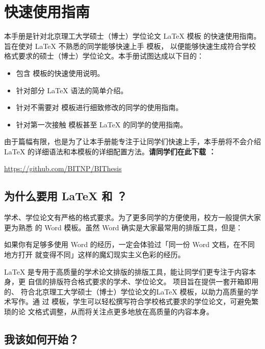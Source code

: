 \chapter{快速使用指南}
\label{chap:what}

本手册是针对北京理工大学硕士（博士）学位论文 \LaTeX{} 模板 \BIThesis{} 的快速使用指南。
旨在使对 \LaTeX{} 不熟悉的同学能够快速上手 \BIThesis{} 模板，
以便能够快速生成符合学校格式要求的硕士（博士）学位论文。本手册试图达成以下目的：
\begin{itemize}[noitemsep]
  \item 包含 \BIThesis{} 模板的快速使用说明。
  \item 针对部分 \LaTeX{} 语法的简单介绍。
  \item 针对不需要对 \BIThesis{} 模板进行细致修改的同学的使用指南。
  \item 针对第一次接触 \BIThesis{} 模板甚至 \LaTeX{} 的同学的使用指南。
\end{itemize}

由于篇幅有限，也是为了让本手册能专注于让同学们快速上手，本手册将不会介绍
\LaTeX{} 的详细语法和本模板的详细配置方法。\textbf{请同学们在此下载 \BIThesis{}：}
\begin{center}
  \url{https://github.com/BITNP/BIThesis}
\end{center}

\section{为什么要用 \LaTeX{} 和 \BIThesis{}？}

学术、学位论文有严格的格式要求。为了更多同学的方便使用，校方一般提供大家更为熟悉
的 Word 模板。虽然 Word 确实是大家最常用的排版工具，但是：
\begin{center}
  \kaishu
  如果你有足够多使用 Word 的经历，一定会体验过「同一份 Word 文档，在不同地方打开
  就变得不同」这样的魔幻现实主义色彩的经历。
\end{center}

\LaTeX{} 是专用于高质量的学术论文排版的排版工具，能让同学们更专注于内容本身，更
自信的排版符合格式要求的学术、学位论文。\BIThesis{} 项目旨在提供一套开箱即用的、
符合北京理工大学硕士（博士）学位论文的\LaTeX{} 模板，以助力高质量的学术写作。通
过 \BIThesis{} 模板，学生可以轻松撰写符合学校格式要求的学位论文，可避免繁琐的论
文格式调整，从而将关注点更多地放在高质量的内容本身。

\section{我该如何开始？}

